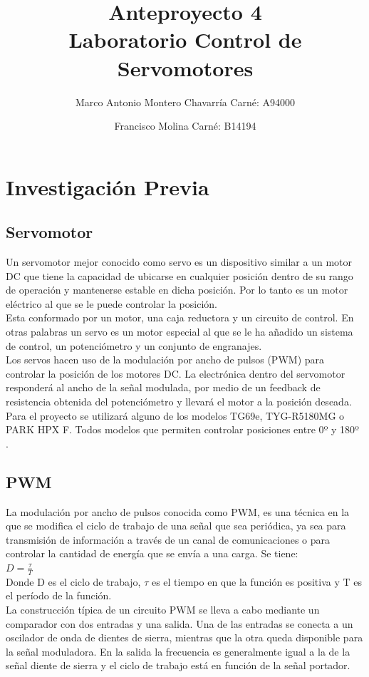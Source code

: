 \documentclass[letterpaper]{article}
\begin{document}
\title{Anteproyecto 4\\ Laboratorio Control de Servomotores}
\author{
 Marco Antonio Montero Chavarría Carné: A94000\\
  \and
  Francisco Molina Carné: B14194\\  
}
\maketitle

\section{Investigación Previa}
\subsection{Servomotor}
 Un servomotor mejor conocido como servo es un dispositivo similar a un motor DC que tiene la capacidad de ubicarse en cualquier posición dentro de su rango de operación y mantenerse estable en dicha posición. Por lo tanto es un motor eléctrico al que se le puede controlar la posición.\\
 Esta conformado por un motor, una caja reductora y un circuito de control. En otras palabras un servo es un motor especial al que se le ha añadido un sistema de control, un potenciómetro y un conjunto de engranajes.\\
 Los servos hacen uso de la modulación por ancho de pulsos (PWM) para controlar la posición de los motores DC. La electrónica dentro del servomotor responderá al ancho de la señal modulada, por medio de un feedback de resistencia obtenida del potenciómetro y llevará el motor a la posición deseada.\\ Para el proyecto se utilizará alguno de los modelos TG69e, TYG-R5180MG o PARK HPX F. Todos modelos que permiten controlar posiciones entre 0º y 180º .
 \newpage
\subsection{PWM}
 La modulación por ancho de pulsos conocida como PWM, es una técnica en la que se modifica el ciclo de trabajo de una señal que sea periódica, ya sea para transmisión de información a través de un canal de comunicaciones o para controlar la cantidad de energía que se envía a una carga. Se tiene:\\
$D= \frac{ \tau }{T}$\\
Donde D es el ciclo de trabajo, $\tau$ es el tiempo en que la función es positiva y T es el período de la función.\\
La construcción típica de un circuito PWM se lleva a cabo mediante un comparador con dos entradas y una salida. Una de las entradas se conecta a un oscilador de onda de dientes de sierra, mientras que la otra queda disponible para la señal moduladora. En la salida la frecuencia es generalmente igual a la de la señal diente de sierra y el ciclo de trabajo está en función de la señal portador.
\end{document}
